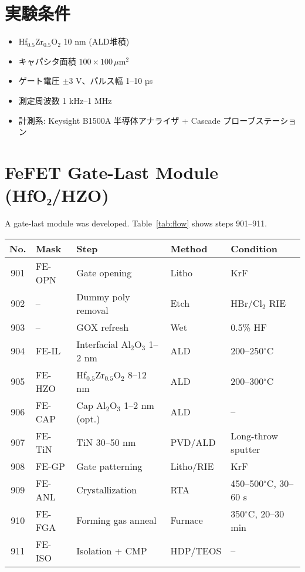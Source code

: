 \documentclass[journal]{IEEEtran}
\begin{document}
\section*{実験条件}
\begin{itemize}
\item Hf$_{0.5}$Zr$_{0.5}$O$_2$ 10 nm (ALD堆積)  
\item キャパシタ面積 $100\times100\,\mu$m$^2$  
\item ゲート電圧 $\pm$3 V、パルス幅 1--10 µs  
\item 測定周波数 1 kHz–1 MHz  
\item 計測系: Keysight B1500A 半導体アナライザ + Cascade プローブステーション  
\end{itemize}

\section{FeFET Gate-Last Module (HfO₂/HZO)}
A gate-last module was developed. Table~\ref{tab:flow} shows steps 901–911.

\begin{table*}[!t]
  \centering
  \caption{FeFET gate-last process module flow.}
  \label{tab:flow}
  \begin{tabular}{@{}cllll@{}}
    \toprule
    No. & Mask & Step & Method & Condition \\
    \midrule
    901 & FE-OPN & Gate opening & Litho & KrF \\
    902 & -- & Dummy poly removal & Etch & HBr/Cl$_2$ RIE \\
    903 & -- & GOX refresh & Wet & 0.5\% HF \\
    904 & FE-IL & Interfacial Al$_2$O$_3$ 1--2 nm & ALD & 200--250$^\circ$C \\
    905 & FE-HZO & Hf$_{0.5}$Zr$_{0.5}$O$_2$ 8--12 nm & ALD & 200--300$^\circ$C \\
    906 & FE-CAP & Cap Al$_2$O$_3$ 1--2 nm (opt.) & ALD & -- \\
    907 & FE-TiN & TiN 30--50 nm & PVD/ALD & Long-throw sputter \\
    908 & FE-GP  & Gate patterning & Litho/RIE & KrF \\
    909 & FE-ANL & Crystallization & RTA & 450--500$^\circ$C, 30--60 s \\
    910 & FE-FGA & Forming gas anneal & Furnace & 350$^\circ$C, 20--30 min \\
    911 & FE-ISO & Isolation + CMP & HDP/TEOS & -- \\
    \bottomrule
  \end{tabular}
\end{table*}
\end{document}
